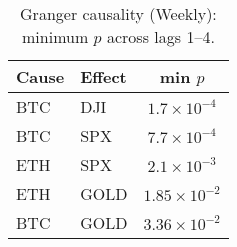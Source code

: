 \begin{table}[!ht]
  \centering
  \caption{Granger causality (Weekly): minimum $p$ across lags 1--4.}
  \label{tab:granger-weekly-appendix}
  \begin{tabular}{l l c}
    \toprule
    \textbf{Cause} & \textbf{Effect} & \textbf{min $p$} \\
    \midrule
    BTC & DJI  & $1.7\times10^{-4}$ \\
    BTC & SPX  & $7.7\times10^{-4}$ \\
    ETH & SPX  & $2.1\times10^{-3}$ \\
    ETH & GOLD & $1.85\times10^{-2}$ \\
    BTC & GOLD & $3.36\times10^{-2}$ \\
    \bottomrule
  \end{tabular}
\end{table}

